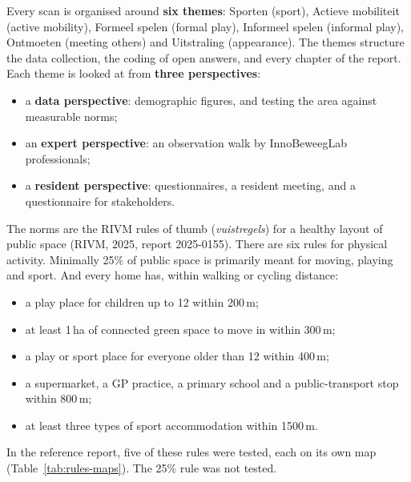 Every scan is organised around \textbf{six themes}: Sporten (sport), Actieve mobiliteit (active mobility), Formeel spelen (formal play), Informeel spelen (informal play), Ontmoeten (meeting others) and Uitstraling (appearance). The themes structure the data collection, the coding of open answers, and every chapter of the report. Each theme is looked at from \textbf{three perspectives}:
\begin{itemize}
\item a \textbf{data perspective}: demographic figures, and testing the area against measurable norms;
\item an \textbf{expert perspective}: an observation walk by InnoBeweegLab professionals;
\item a \textbf{resident perspective}: questionnaires, a resident meeting, and a questionnaire for stakeholders.
\end{itemize}
The norms are the RIVM rules of thumb (\textit{vuistregels}) for a healthy layout of public space (RIVM, 2025, report 2025-0155). There are six rules for physical activity. Minimally 25\% of public space is primarily meant for moving, playing and sport. And every home has, within walking or cycling distance:
\begin{itemize}
\item a play place for children up to 12 within 200\,m;
\item at least 1\,ha of connected green space to move in within 300\,m;
\item a play or sport place for everyone older than 12 within 400\,m;
\item a supermarket, a GP practice, a primary school and a public-transport stop within 800\,m;
\item at least three types of sport accommodation within 1500\,m.
\end{itemize}
In the reference report, five of these rules were tested, each on its own map (Table~\ref{tab:rules-maps}). The 25\% rule was not tested.

